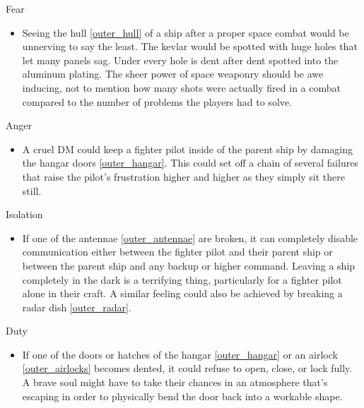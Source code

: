 \documentclass[a4paper]{article}
\begin{document}
\vspace{0.3cm}
\begin{minipage}[t]{0.4\linewidth}
Fear
\begin{itemize}
\item Seeing the hull \ref{outer_hull} of a ship after a proper space combat would be unnerving to say the least. The kevlar would be spotted with huge holes that let many panels sag. Under every hole is dent after dent spotted into the aluminum plating. The sheer power of space weaponry should be awe inducing, not to mention how many shots were actually fired in a combat compared to the number of problems the players had to solve.
\end{itemize}
\end{minipage} 
\begin{minipage}[t]{0.4\linewidth}
Anger
\begin{itemize}
\item A cruel DM could keep a fighter pilot inside of the parent ship by damaging the hangar doors \ref{outer_hangar}. This could set off a chain of several failures that raise the pilot's frustration higher and higher as they simply sit there still.
\end{itemize}
\end{minipage}

\begin{minipage}[t]{0.4\linewidth}
Isolation
\begin{itemize}
\item If one of the antennae \ref{outer_antennae} are broken, it can completely disable communication either between the fighter pilot and their parent ship or between the parent ship and any backup or higher command. Leaving a ship completely in the dark is a terrifying thing, particularly for a fighter pilot alone in their craft. A similar feeling could also be achieved by breaking a radar dish \ref{outer_radar}. 
\end{itemize}
\end{minipage}
\begin{minipage}[t]{0.4\linewidth}
Duty
\begin{itemize}
\item If one of the doors or hatches of the hangar \ref{outer_hangar} or an airlock \ref{outer_airlocks} becomes dented, it could refuse to open, close, or lock fully. A brave soul might have to take their chances in an atmosphere that's escaping in order to physically bend the door back into a workable shape.
\end{itemize}
\end{minipage}
\end{document}
